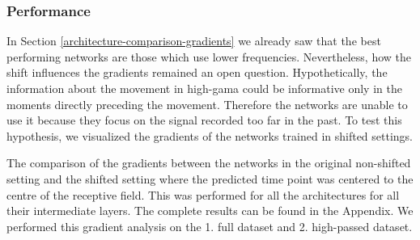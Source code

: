 \subsubsection{Performance}
In Section \ref{architecture-comparison-gradients} we already saw that the best performing networks are those which use lower frequencies.
Nevertheless, how the shift influences the gradients remained an open question.
Hypothetically, the information about the movement in high-gama could be informative only in the moments directly preceding the movement.
Therefore the networks are unable to use it because they focus on the signal recorded too far in the past.
To test this hypothesis, we visualized the gradients of the networks trained in shifted settings.

The comparison of the gradients between the networks in the original non-shifted setting and the shifted setting where the predicted time point was centered to the centre of the receptive field.
This was performed for all the architectures for all their intermediate layers.
The complete results can be found in the Appendix.
We performed this gradient analysis on the 1. full dataset and 2. high-passed dataset.


